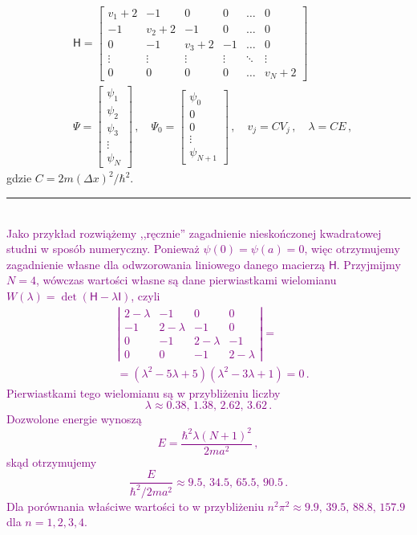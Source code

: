 \documentclass{myclass}
\begin{document}
\begin{equation*}
\begin{split}
&\mathsf{H}=\begin{bmatrix}
v_1+2& -1& 0& 0& \ldots& 0\\
-1& v_2+2& -1& 0& \ldots& 0\\
0& -1& v_3+2& -1& \ldots& 0\\
\vdots& \vdots& \vdots&\vdots&\ddots&\vdots\\
0& 0& 0& 0& \ldots& v_N+2
\end{bmatrix}\\
&\mathsf{\Psi}=\begin{bmatrix}
\psi_1\\
\psi_2\\
\psi_3\\
\vdots\\
\psi_N
\end{bmatrix}\,,\quad
\mathsf{\Psi}_0=\begin{bmatrix}
\psi_0\\
0\\
0\\
\vdots\\
\psi_{N+1}
\end{bmatrix}\,,\quad v_j=CV_j\,,\quad \lambda=CE\,,
\end{split}
\end{equation*}
gdzie \(C=2m(\Delta x)^2/\hbar^2\).\\
\noindent\rule{\columnwidth}{0.5pt}\\
\textcolor{purple}{Jako przykład rozwiążemy ,,ręcznie'' zagadnienie nieskończonej kwadratowej studni
w sposób numeryczny. Ponieważ \(\psi(0)=\psi(a)=0\), więc otrzymujemy zagadnienie własne dla
odwzorowania liniowego danego macierzą \(\mathsf{H}\). Przyjmijmy \(N=4\), wówczas wartości własne
są dane pierwiastkami wielomianu \(W(\lambda)=\det(\mathsf{H}-\lambda\mathsf{I})\), czyli
\begin{equation*}
\begin{split}
&\left|\begin{matrix}
2-\lambda& -1& 0& 0\\
-1& 2-\lambda& -1& 0\\
0&  -1& 2-\lambda& -1\\
0& 0& -1& 2-\lambda
\end{matrix}\right|=\\
&=(\lambda^2-5\lambda+5)(\lambda^2-3\lambda+1)=0\,.
\end{split}
\end{equation*}
Pierwiastkami tego wielomianu są w przybliżeniu liczby
\begin{equation*}
\lambda\approx0.38,\,1.38,\,2.62,\,3.62\,.
\end{equation*}
Dozwolone energie wynoszą
\begin{equation*}
E=\frac{\hbar^2\lambda(N+1)^2}{2ma^2}\,,
\end{equation*}
skąd otrzymujemy
\begin{equation*}
\frac{E}{\hbar^2/2ma^2}\approx 9.5,\,34.5,\,65.5,\,90.5\,.
\end{equation*}
Dla porównania właściwe wartości to w przybliżeniu \(n^2\pi^2\approx 9.9,\,39.5,\,88.8,\,157.9\) dla
\(n=1,2,3,4\).}\\
\end{document}
